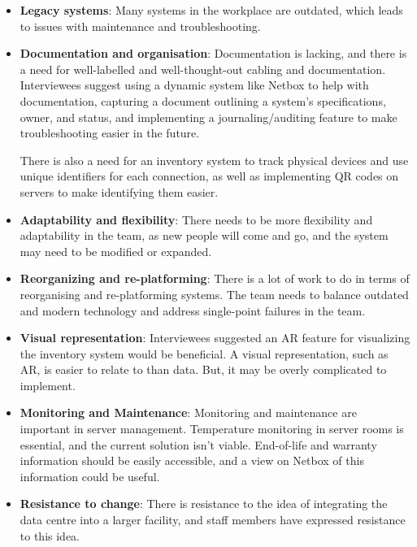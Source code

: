 \documentclass [11pt,a4paper]{article}
\begin{document}
\begin{itemize}[topsep=0pt]
    \item \textbf{Legacy systems}: Many systems in the workplace are outdated, which leads to issues with maintenance and troubleshooting.

    \item \textbf{Documentation and organisation}: Documentation is lacking, and there is a need for well-labelled and well-thought-out cabling and documentation. Interviewees suggest using a dynamic system like Netbox to help with documentation, capturing a document outlining a system's specifications, owner, and status, and implementing a journaling/auditing feature to make troubleshooting easier in the future. 
    
    \pagebreak
    
    There is also a need for an inventory system to track physical devices and use unique identifiers for each connection, as well as implementing QR codes on servers to make identifying them easier.

    \item \textbf{Adaptability and flexibility}: There needs to be more flexibility and adaptability in the team, as new people will come and go, and the system may need to be modified or expanded.

    \item \textbf{Reorganizing and re-platforming}: There is a lot of work to do in terms of reorganising and re-platforming systems. The team needs to balance outdated and modern technology and address single-point failures in the team.

    \item \textbf{Visual representation}: Interviewees suggested an AR feature for visualizing the inventory system would be beneficial. A visual representation, such as AR, is easier to relate to than data. But, it may be overly complicated to implement.

    \item \textbf{Monitoring and Maintenance}: Monitoring and maintenance are important in server management. Temperature monitoring in server rooms is essential, and the current solution isn't viable. End-of-life and warranty information should be easily accessible, and a view on Netbox of this information could be useful.

    \item \textbf{Resistance to change}: There is resistance to the idea of integrating the data centre into a larger facility, and staff members have expressed resistance to this idea.

\end{itemize}
\end{document}
